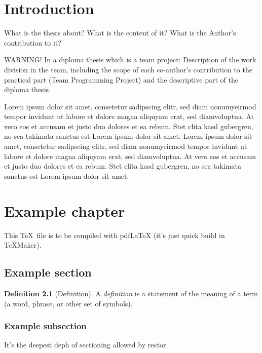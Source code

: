 \documentclass[a4paper,11pt,twoside]{report}
\theoremstyle{definition}
\newtheorem{definition}[theorem]{Definition}
\begin{document}
\chapter{Introduction}

What is the thesis about? What is the content of it? What is the Author's contribution to it?
\par
WARNING!  In a diploma thesis which is a team project: Description of the work division in the team, including the scope of each co-author’s contribution to the practical part (Team Programming Project) and the descriptive part of the diploma thesis.
\par

Lorem ipsum dolor sit amet, consetetur sadipscing elitr, sed diam nonumyeirmod tempor invidunt ut labore et dolore magna aliquyam erat, sed diamvoluptua. At vero eos et accusam et justo duo dolores et ea rebum. Stet clita kasd gubergren, no sea takimata sanctus est Lorem ipsum dolor sit amet. Lorem ipsum dolor sit amet, consetetur sadipscing elitr, sed diam nonumyeirmod tempor invidunt ut labore et dolore magna aliquyam erat, sed diamvoluptua. At vero eos et accusam et justo duo dolores et ea rebum. Stet clita kasd gubergren, no sea takimata sanctus est Lorem ipsum dolor sit amet.

\chapter{Example chapter}

This \TeX~file is to be compiled with pdfLaTeX (it's just quick build in TeXMaker).


\section{Example section}

\begin{definition}[Definition]
    A \emph{definition} is a statement of the meaning of a term (a word, phrase, or other set of symbols).
\end{definition}

\subsection{Example subsection}

It's the deepest deph of sectioning allowed by rector.
\end{document}
